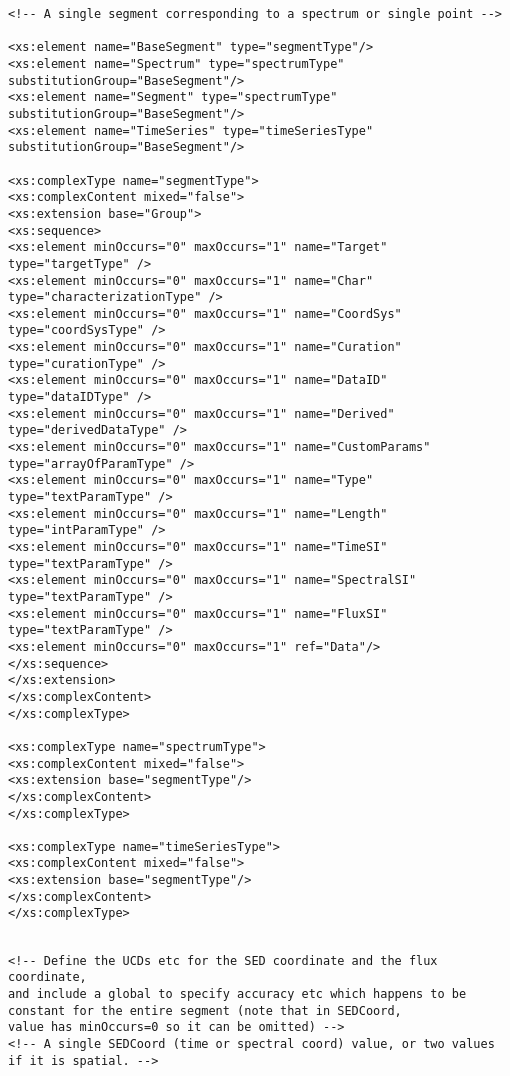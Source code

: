 {\begin{flushleft}
\begin{fmppage}
\begin{verbatim}
<!-- A single segment corresponding to a spectrum or single point -->

<xs:element name="BaseSegment" type="segmentType"/>
<xs:element name="Spectrum" type="spectrumType" substitutionGroup="BaseSegment"/>
<xs:element name="Segment" type="spectrumType" substitutionGroup="BaseSegment"/>
<xs:element name="TimeSeries" type="timeSeriesType" substitutionGroup="BaseSegment"/>

<xs:complexType name="segmentType">
<xs:complexContent mixed="false">
<xs:extension base="Group">
<xs:sequence>
<xs:element minOccurs="0" maxOccurs="1" name="Target" type="targetType" />
<xs:element minOccurs="0" maxOccurs="1" name="Char" type="characterizationType" />
<xs:element minOccurs="0" maxOccurs="1" name="CoordSys" type="coordSysType" />
<xs:element minOccurs="0" maxOccurs="1" name="Curation" type="curationType" />
<xs:element minOccurs="0" maxOccurs="1" name="DataID" type="dataIDType" />
<xs:element minOccurs="0" maxOccurs="1" name="Derived" type="derivedDataType" />
<xs:element minOccurs="0" maxOccurs="1" name="CustomParams" type="arrayOfParamType" />
<xs:element minOccurs="0" maxOccurs="1" name="Type" type="textParamType" />
<xs:element minOccurs="0" maxOccurs="1" name="Length" type="intParamType" />
<xs:element minOccurs="0" maxOccurs="1" name="TimeSI" type="textParamType" />
<xs:element minOccurs="0" maxOccurs="1" name="SpectralSI" type="textParamType" />
<xs:element minOccurs="0" maxOccurs="1" name="FluxSI" type="textParamType" />
<xs:element minOccurs="0" maxOccurs="1" ref="Data"/>
</xs:sequence>
</xs:extension>
</xs:complexContent>
</xs:complexType>

<xs:complexType name="spectrumType">
<xs:complexContent mixed="false">
<xs:extension base="segmentType"/>
</xs:complexContent>
</xs:complexType>

<xs:complexType name="timeSeriesType">
<xs:complexContent mixed="false">
<xs:extension base="segmentType"/>
</xs:complexContent>
</xs:complexType>

\end{verbatim}
\end{fmppage}

\begin{fmppage}
\begin{verbatim}

<!-- Define the UCDs etc for the SED coordinate and the flux coordinate,
and include a global to specify accuracy etc which happens to be
constant for the entire segment (note that in SEDCoord,
value has minOccurs=0 so it can be omitted) -->
<!-- A single SEDCoord (time or spectral coord) value, or two values if it is spatial. -->


\end{verbatim}
\end{fmppage}
\end{flushleft}}

